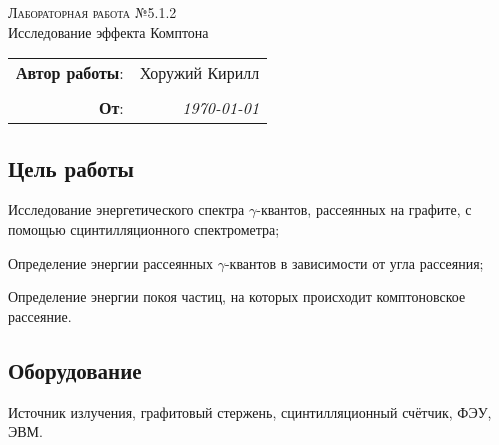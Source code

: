 
\phantom{42}
\vspace{20mm}

\begin{center}
    \LARGE \textsc{Лабораторная работа №5.1.2} \\
    \vspace{3 mm}
    \large Исследование эффекта Комптона
\end{center}


\phantom{42}

\begin{flushright}
    \begin{tabular}{rr}
        \textbf{Автор работы}: 
        & Хоружий Кирилл \\
        & \\
        \textbf{От}: &
        \textit{\today}\\
    \end{tabular}
\end{flushright}

\thispagestyle{empty}

\vspace{10mm}


\subsection*{Цель работы}
\begin{enumerate*}
    \item Исследование энергетического спектра $\gamma$-квантов, рассеянных на графите, с помощью сцинтилляционного спектрометра;
    \item Определение энергии рассеянных $\gamma$-квантов в зависимости от угла рассеяния;
    \item Определение энергии покоя частиц, на которых происходит комптоновское рассеяние.
\end{enumerate*}


\subsection*{Оборудование}
Источник излучения, 
графитовый стержень,
сцинтилляционный счётчик,
ФЭУ, 
ЭВМ.


\newpage
